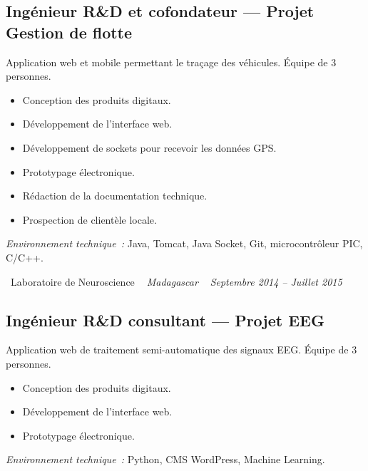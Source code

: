 \documentclass[10pt,a4paper]{article}
\begin{document}
\subsection*{Ingénieur R\&D et cofondateur --- Projet Gestion de flotte}
\color{darkgray}
Application web et mobile permettant le traçage des véhicules. Équipe de 3 personnes.
\begin{itemize}
  \item Conception des produits digitaux.
  \item Développement de l'interface web.
  \item Développement de sockets pour recevoir les données GPS.
  \item Prototypage électronique.
  \item Rédaction de la documentation technique.
  \item Prospection de clientèle locale.
\end{itemize}
\textit{Environnement technique~:} Java, Tomcat, Java Socket, Git, microcontrôleur PIC, C/C++.

\vspace{10pt}

\noindent\textcolor{primary}{ \faBuilding\ Laboratoire de Neuroscience} \quad
\textit{ \small \textcolor{darkgray}{ \faMapMarker\ } Madagascar } \hfill
\textit{ \small \textcolor{darkgray}{ \faCalendar\ } Septembre 2014 -- Juillet 2015 }

\vspace{4pt}

\subsection*{Ingénieur R\&D consultant --- Projet EEG}
\color{darkgray}
Application web de traitement semi-automatique des signaux EEG. Équipe de 3 personnes.
\begin{itemize}
  \item Conception des produits digitaux.
  \item Développement de l'interface web.
  \item Prototypage électronique.
\end{itemize}
\textit{Environnement technique~:} Python, CMS WordPress, Machine Learning.

\vspace{14pt}
\end{document}
